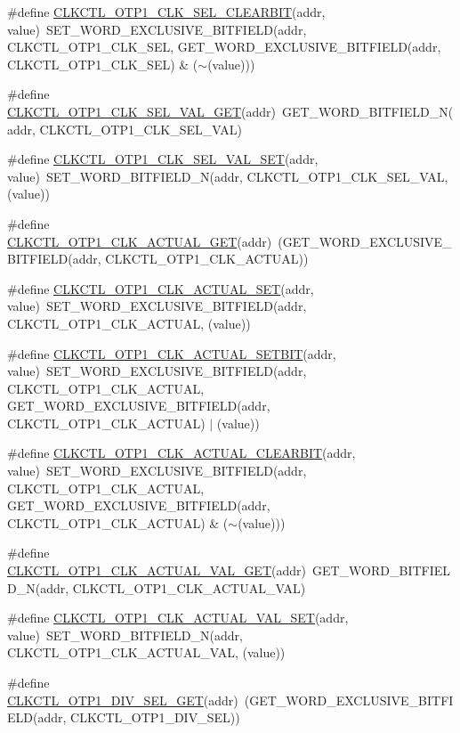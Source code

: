 \begin{DoxyCompactItemize}
\#define \hyperlink{a00544_af48c1d90a788ee02bdb647dc2445f2a1}{CLKCTL\_\-OTP1\_\-CLK\_\-SEL\_\-CLEARBIT}(addr, value)~SET\_\-WORD\_\-EXCLUSIVE\_\-BITFIELD(addr, CLKCTL\_\-OTP1\_\-CLK\_\-SEL, GET\_\-WORD\_\-EXCLUSIVE\_\-BITFIELD(addr, CLKCTL\_\-OTP1\_\-CLK\_\-SEL) \& ($\sim$(value)))
\item 
\#define \hyperlink{a00544_ad1c276377bd7f67f4eecca46bc0df379}{CLKCTL\_\-OTP1\_\-CLK\_\-SEL\_\-VAL\_\-GET}(addr)~GET\_\-WORD\_\-BITFIELD\_\-N(addr, CLKCTL\_\-OTP1\_\-CLK\_\-SEL\_\-VAL)
\item 
\#define \hyperlink{a00544_a70ea508a307a15dee8f95b5b6e11a10e}{CLKCTL\_\-OTP1\_\-CLK\_\-SEL\_\-VAL\_\-SET}(addr, value)~SET\_\-WORD\_\-BITFIELD\_\-N(addr, CLKCTL\_\-OTP1\_\-CLK\_\-SEL\_\-VAL, (value))
\item 
\#define \hyperlink{a00544_ae7300459e22c249bd4126989aada8ab5}{CLKCTL\_\-OTP1\_\-CLK\_\-ACTUAL\_\-GET}(addr)~(GET\_\-WORD\_\-EXCLUSIVE\_\-BITFIELD(addr, CLKCTL\_\-OTP1\_\-CLK\_\-ACTUAL))
\item 
\#define \hyperlink{a00544_ad06ac867c43ab3e398dc77df74eb5390}{CLKCTL\_\-OTP1\_\-CLK\_\-ACTUAL\_\-SET}(addr, value)~SET\_\-WORD\_\-EXCLUSIVE\_\-BITFIELD(addr, CLKCTL\_\-OTP1\_\-CLK\_\-ACTUAL, (value))
\item 
\#define \hyperlink{a00544_afbd9e389898b9b78bde8a7c9cefdfa75}{CLKCTL\_\-OTP1\_\-CLK\_\-ACTUAL\_\-SETBIT}(addr, value)~SET\_\-WORD\_\-EXCLUSIVE\_\-BITFIELD(addr, CLKCTL\_\-OTP1\_\-CLK\_\-ACTUAL, GET\_\-WORD\_\-EXCLUSIVE\_\-BITFIELD(addr, CLKCTL\_\-OTP1\_\-CLK\_\-ACTUAL) $|$ (value))
\item 
\#define \hyperlink{a00544_a6b94e164830a8156e97a6a093cd08e65}{CLKCTL\_\-OTP1\_\-CLK\_\-ACTUAL\_\-CLEARBIT}(addr, value)~SET\_\-WORD\_\-EXCLUSIVE\_\-BITFIELD(addr, CLKCTL\_\-OTP1\_\-CLK\_\-ACTUAL, GET\_\-WORD\_\-EXCLUSIVE\_\-BITFIELD(addr, CLKCTL\_\-OTP1\_\-CLK\_\-ACTUAL) \& ($\sim$(value)))
\item 
\#define \hyperlink{a00544_a37711161b435375b23b74306675479b7}{CLKCTL\_\-OTP1\_\-CLK\_\-ACTUAL\_\-VAL\_\-GET}(addr)~GET\_\-WORD\_\-BITFIELD\_\-N(addr, CLKCTL\_\-OTP1\_\-CLK\_\-ACTUAL\_\-VAL)
\item 
\#define \hyperlink{a00544_a673e8ae00e72fb96faa2df87dceed8c4}{CLKCTL\_\-OTP1\_\-CLK\_\-ACTUAL\_\-VAL\_\-SET}(addr, value)~SET\_\-WORD\_\-BITFIELD\_\-N(addr, CLKCTL\_\-OTP1\_\-CLK\_\-ACTUAL\_\-VAL, (value))
\item 
\#define \hyperlink{a00544_a248bcdb7f33e596a4f88a590afe98132}{CLKCTL\_\-OTP1\_\-DIV\_\-SEL\_\-GET}(addr)~(GET\_\-WORD\_\-EXCLUSIVE\_\-BITFIELD(addr, CLKCTL\_\-OTP1\_\-DIV\_\-SEL))

\end{DoxyCompactItemize}
